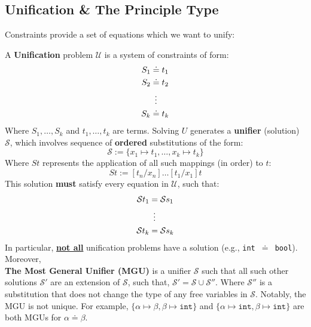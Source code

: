     
\newpage 
\subsection{Unification \& The Principle Type}

\noindent
Constraints provide a set of equations which we want to unify:
\begin{Def}

    A \textbf{Unification} problem $\mathcal{U}$ is a system of constraints of form:
    \begin{align*}
        S_1 &\doteq t_1 \\
        S_2 &\doteq t_2 \\
        &\hspace{.5em}\vdots \\
        S_k &\doteq t_k
    \end{align*}
    \noindent
    Where $S_1, \ldots, S_k$ and $t_1, \ldots, t_k$ are terms. Solving $U$ generates a \textbf{unifier} (solution) $\mathcal{S}$, which involves
    sequence of \textbf{ordered} substitutions of the form:
    \[ \mathcal{S} := \{x_1 \mapsto t_1, \ldots, x_k \mapsto t_k\} \]
    \noindent
    Where $St$ represents the application of all such mappings (in order) to $t$:
    \[St:= [t_n/x_n] \ldots [t_1/x_1]t\]
    This solution \textbf{must} satisfy every equation in $\mathcal{U}$, such that:
    \begin{align*}
        \mathcal{S}t_1 &= \mathcal{S}s_1 \\
        &\hspace{.5em}\vdots \\
        \mathcal{S}t_k &= \mathcal{S}s_k
    \end{align*}
    \noindent
    In particular, \underline{\textbf{not all}} unification problems have a solution (e.g., \texttt{int }$\doteq$\texttt{ bool}). Moreover,\\
    \textbf{The Most General Unifier (MGU)} is a unifier $\mathcal{S}$ such that all such other solutions $\mathcal{S}'$ are an extension of $\mathcal{S}$, such that,
    $\mathcal{S}' = \mathcal{S} \cup \mathcal{S}''$.
    Where $\mathcal{S}''$ is a substitution that does not change the type of any free variables in $\mathcal{S}$. Notably, the MGU is not unique. For example, $\{\alpha \mapsto \beta, \beta \mapsto \texttt{int}\}$ and $\{\alpha \mapsto \texttt{int}, \beta \mapsto \texttt{int}\}$ are both MGUs for $\alpha \doteq \beta$.\\
    

\end{Def}
